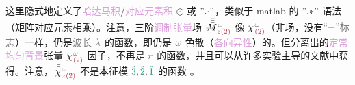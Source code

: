 这里隐式地定义了\textcolor{Plum}{哈达马积}/\textcolor{Plum}{对应元素积} $\odot$ 或 $"{.\cdot}"$，类似于 matlab 的 $"{.*}"$ 语法（矩阵对应元素相乘）。注意，三阶\textcolor{Plum}{调制张量}\textcolor{NavyBlue}{场} $\xint{\mathcolor{gray}{-}}{18}{\bar{\bar{\bar{M}}}}^{\;\! \mathcolor{gray}{\omega} }_{\;\! \mathcolor{gray}{z} \textcolor{Maroon}{(2)} }$ 像 ${\chi}^{\;\! \mathcolor{gray}{\omega} }_{\;\! \textcolor{Maroon}{(2)} }$（\textcolor{NavyBlue}{非场}，没有\textcolor{gray}{“$-$”标志}）一样，仍是\textcolor{gray}{波长} $\mathcolor{gray}{\lambda}$ 的函数，即仍是 $\mathcolor{gray}{\omega}$ \textcolor{NavyBlue}{色散}（\textcolor{Plum}{各向异性}）的。但分离出的\textcolor{Plum}{定常}\textcolor{Plum}{均匀背景}张量 ${\chi}^{\;\! \mathcolor{gray}{\omega} }_{\;\! \textcolor{Maroon}{(2)} }$ 因子，不再是 $\mathcolor{gray}{\bar{r}}$ 的函数，并且可以从许多\textcolor{NavyBlue}{实验主导}的文献中获得\cite{nyePhysicalPropertiesCrystals2012,zuOpticalSecondHarmonic2024,zuAnalyticalNumericalModeling2022,gananyQuasiphaseMatchingLiNbO32006,segondsLinearNonlinearOptical2004,dolevLinearNonlinearOptical2009,kaschkeCalculationNonlinearOptical1989,itoGeneralizedStudyAngular1975}。注意，$\xint{{}^{}_{\mathcolor{gray}{-}}}{23}{\bar{\bar{\bar{\chi}}}}^{\;\! \mathcolor{gray}{\omega} }_{\;\! \mathcolor{gray}{z} \textcolor{Maroon}{(2)} }$ 不是\textcolor{PineGreen}{本征模} $\textcolor{PineGreen}{\hat{3}},\textcolor{PineGreen}{\hat{2}},\textcolor{PineGreen}{\hat{1}}$ 的函数 。

